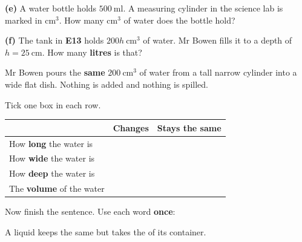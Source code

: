\documentclass[12pt,a4paper]{article}
\newif\ifkey
\newcommand{\qlines}[1]{\par\needspace{\numexpr#1+1\relax\baselineskip}\wlines{#1}}
\begin{document}
\vspace{4pt}
\noindent \textbf{(e)} A water bottle holds $500\ \mathrm{ml}$. A measuring cylinder
in the science lab is marked in $\mathrm{cm^3}$. How many $\mathrm{cm^3}$ of water
does the bottle hold? \hfill \blank[3.4cm]

\vspace{8pt}
\noindent \textbf{(f)} The tank in \textbf{E13} holds $200h\ \mathrm{cm^3}$ of water.
Mr Bowen fills it to a depth of $h = 25\ \mathrm{cm}$. How many \textbf{litres} is
that?
\qlines{3}


\noindent Mr Bowen pours the \textbf{same} $200\ \mathrm{cm^3}$ of water from a tall
narrow cylinder into a wide flat dish. Nothing is added and nothing is spilled.

\vspace{7pt}
\noindent Tick one box in each row.

\vspace{6pt}
\noindent
\begin{tabularx}{\textwidth}{|X|c|c|}
  \hline
  & \textbf{Changes} & \textbf{Stays the same} \\
  \hline
  How \textbf{long} the water is \rule[-0.65em]{0pt}{2.0em}   & & \\ \hline
  How \textbf{wide} the water is \rule[-0.65em]{0pt}{2.0em}   & & \\ \hline
  How \textbf{deep} the water is \rule[-0.65em]{0pt}{2.0em}   & & \\ \hline
  The \textbf{volume} of the water \rule[-0.65em]{0pt}{2.0em} & & \\ \hline
\end{tabularx}

\vspace{10pt}
\noindent Now finish the sentence. Use each word \textbf{once}:
\;\quad{}

\vspace{8pt}
\noindent A liquid keeps the same \blank[3.4cm] but takes the \blank[3.4cm] of its
container.

\ifkey
\clearpage
\end{document}
